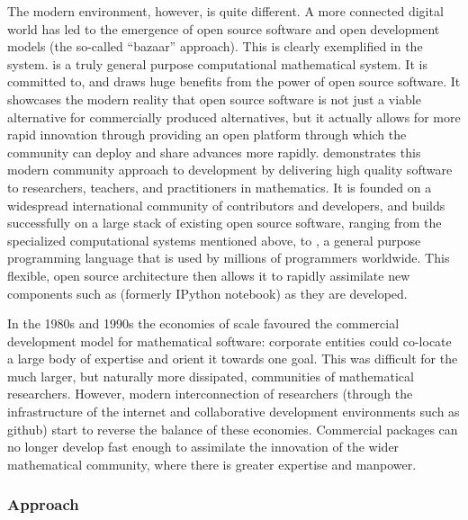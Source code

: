 The modern environment, however, is quite different. A more connected
digital world has led to the emergence of open source software and
open development models (the so-called ``bazaar'' approach). This is
clearly exemplified in the \Sage system. \Sage is a truly
general purpose computational mathematical system. It is committed to,
and draws huge benefits from the power of open source software.
It showcases the modern
reality that open source software is not just a viable alternative for
commercially produced alternatives, but it actually allows for more
rapid innovation through providing an open platform through which the
community can deploy and share advances more rapidly. \Sage demonstrates
this modern community approach to development by
delivering high quality software to researchers, teachers, and
practitioners in mathematics. It is founded on a widespread
international community of contributors and developers, and builds
successfully on a large stack of existing open source software,
ranging from the specialized computational systems mentioned above, to
\Python, a general purpose programming language that is used by
millions of programmers worldwide. This flexible, open source
architecture then allows it to rapidly assimilate new components such
as \Jupyter (formerly IPython notebook) as they are developed.

In the 1980s and 1990s the economies of scale favoured the commercial
development model for mathematical software: corporate entities could
co-locate a large body of expertise and orient it towards one
goal. This was difficult for the much larger, but naturally more
dissipated, communities of mathematical researchers. However, modern
interconnection of researchers (through the infrastructure of the
internet and collaborative development environments such as github)
start to reverse the balance of these economies. Commercial packages
can no longer develop fast enough to assimilate the innovation of the
wider mathematical community, where there is greater expertise and
manpower.




\subsubsection{Approach}

